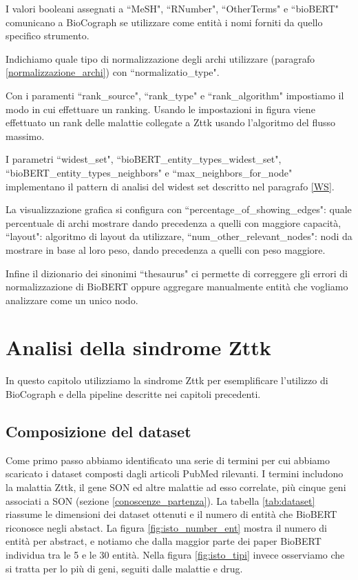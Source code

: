 \documentclass[12pt]{report}
\newcommand{\quotes}[1]{``#1"}
\begin{document}
I valori booleani assegnati a \quotes{MeSH}, \quotes{RNumber}, \quotes{OtherTerms} e \quotes{bioBERT} comunicano a BioCograph se utilizzare come entità i nomi forniti da quello specifico strumento.

Indichiamo quale tipo di normalizzazione degli archi utilizzare (paragrafo \ref{normalizzazione_archi}) con \quotes{normalizatio\_type}.

Con i paramenti \quotes{rank\_source}, \quotes{rank\_type} e \quotes{rank\_algorithm} impostiamo il modo in cui effettuare un ranking. Usando le impostazioni in figura viene effettuato un rank delle malattie collegate a Zttk usando l'algoritmo del flusso massimo.

I parametri \quotes{widest\_set}, \quotes{bioBERT\_entity\_types\_widest\_set}, \quotes{bioBERT\_entity\_types\_neighbors} e \quotes{max\_neighbors\_for\_node} implementano il pattern di analisi del widest set descritto nel paragrafo \ref{WS}.

La visualizzazione grafica si configura con \quotes{percentage\_of\_showing\_edges}: quale percentuale di archi mostrare dando precedenza a quelli con maggiore capacità, \quotes{layout}: algoritmo di layout da utilizzare, \quotes{num\_other\_relevant\_nodes}: nodi da mostrare in base al loro peso, dando precedenza a quelli con peso maggiore.
 
Infine il dizionario dei sinonimi \quotes{thesaurus} ci permette di correggere gli errori di normalizzazione di BioBERT oppure aggregare manualmente entità che vogliamo analizzare come un unico nodo.



\chapter{Analisi della sindrome Zttk \label{analisi}}

In questo capitolo utilizziamo la sindrome Zttk per esemplificare l'utilizzo di BioCograph e della pipeline descritte nei capitoli precedenti. 

\section{Composizione del dataset}
Come primo passo abbiamo identificato una serie di termini per cui abbiamo scaricato i dataset composti dagli articoli PubMed rilevanti. I termini includono la malattia Zttk, il gene SON ed altre malattie ad esso correlate, più cinque geni associati a SON (sezione \ref{conoscenze_partenza}). 
La tabella \ref{tab:dataset} riassume le dimensioni dei dataset ottenuti  e il numero di entità che BioBERT riconosce negli abstact. La figura \ref{fig:isto_number_ent} mostra il numero di entità per abstract, e notiamo che dalla maggior parte dei paper BioBERT individua tra le 5 e le 30 entità. Nella figura \ref{fig:isto_tipi} invece osserviamo che si tratta per lo più di geni, seguiti dalle malattie e drug.
\end{document}
